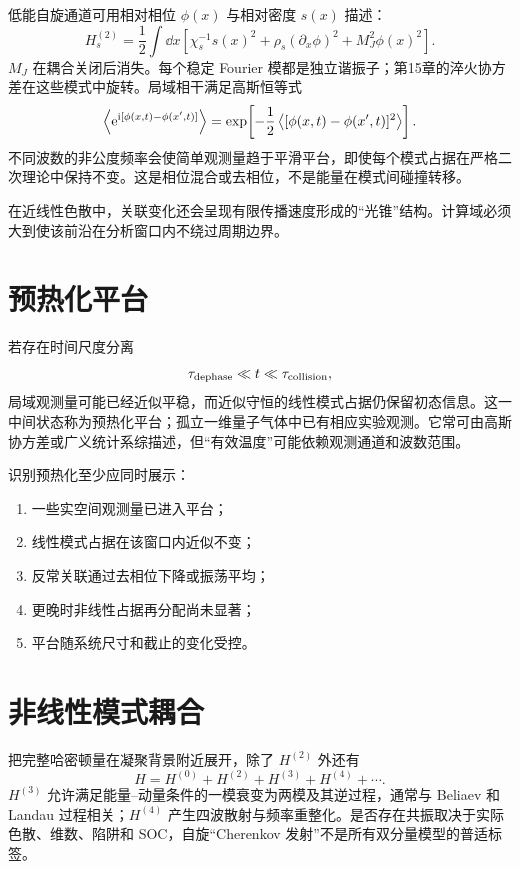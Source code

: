 低能自旋通道可用相对相位 $\phi(x)$ 与相对密度 $s(x)$ 描述：
\begin{equation}
  H_s^{(2)}=\frac12\int\dd x\left[
  \chi_s^{-1}s(x)^2+\rho_s(\partial_x\phi)^2
  +M_J^2\phi(x)^2\right].
  \label{eq:spin-hydrodynamic-hamiltonian}
\end{equation}
$M_J$ 在耦合关闭后消失。每个稳定 Fourier 模都是独立谐振子；第15章的淬火协方差在这些模式中旋转。局域相干满足高斯恒等式
\begin{equation}
  \left\langle \mathrm{e}^{\mathrm{i}[\phi(x,t)-\phi(x',t)]}\right\rangle
  =\exp\!\left[-\frac12
  \left\langle [\phi(x,t)-\phi(x',t)]^2\right\rangle\right].
  \label{eq:gaussian-spatial-coherence}
\end{equation}
不同波数的非公度频率会使简单观测量趋于平滑平台，即使每个模式占据在严格二次理论中保持不变。这是相位混合或去相位，不是能量在模式间碰撞转移。

在近线性色散中，关联变化还会呈现有限传播速度形成的“光锥”结构。计算域必须大到使该前沿在分析窗口内不绕过周期边界。

\section{预热化平台}

若存在时间尺度分离
\begin{equation}
  \tau_{\rm dephase}\ll t\ll\tau_{\rm collision},
  \label{eq:prethermal-window}
\end{equation}
局域观测量可能已经近似平稳，而近似守恒的线性模式占据仍保留初态信息。这一中间状态称为预热化平台；孤立一维量子气体中已有相应实验观测\cite{Gring2012}。它常可由高斯协方差或广义统计系综描述，但“有效温度”可能依赖观测通道和波数范围。

识别预热化至少应同时展示：
\begin{enumerate}
  \item 一些实空间观测量已进入平台；
  \item 线性模式占据在该窗口内近似不变；
  \item 反常关联通过去相位下降或振荡平均；
  \item 更晚时非线性占据再分配尚未显著；
  \item 平台随系统尺寸和截止的变化受控。
\end{enumerate}

\section{非线性模式耦合}

把完整哈密顿量在凝聚背景附近展开，除了 $H^{(2)}$ 外还有
\begin{equation}
  H=H^{(0)}+H^{(2)}+H^{(3)}+H^{(4)}+\cdots.
\end{equation}
$H^{(3)}$ 允许满足能量--动量条件的一模衰变为两模及其逆过程，通常与 Beliaev 和 Landau 过程相关；$H^{(4)}$ 产生四波散射与频率重整化。是否存在共振取决于实际色散、维数、陷阱和 SOC，自旋“Cherenkov 发射”不是所有双分量模型的普适标签。

